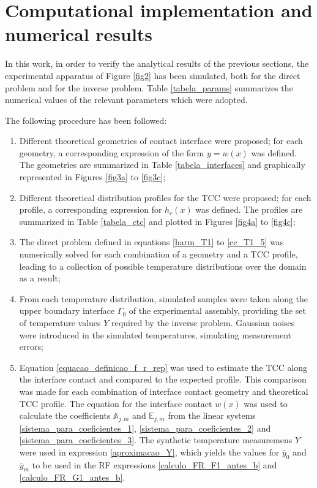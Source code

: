 \documentclass[12pt]{CHT-20}
\begin{document}
\section*{Computational implementation and numerical results}

In this work, in order to verify the analytical results of the previous sections, the experimental apparatus of Figure \ref{fig2} has been simulated, both for the direct problem and for the inverse problem. Table \ref{tabela_params} summarizes the numerical values of the relevant parameters which were adopted. 

The following procedure has been followed:
\begin{enumerate}
	\item Different theoretical geometries of contact interface were proposed; for each geometry, a corresponding expression of the form $y = w(x)$ was defined. The geometries are summarized in Table \ref{tabela_interfaces} and graphically represented in Figures \ref{fig3a} to \ref{fig3c};
	\item Different theoretical distribution profiles for the TCC were proposed; for each profile, a corresponding expression for $h_c(x)$ was defined. The profiles are summarized in Table \ref{tabela_ctc} and plotted in Figures \ref{fig4a} to \ref{fig4c};
	\item The direct problem defined in equations \eqref{harm_T1} to \eqref{cc_T1_5} was numerically solved for each combination of a geometry and a TCC profile, leading to a collection of possible temperature distributions over the domain as a result;
	\item From each temperature distribution, simulated samples were taken along the upper boundary interface $\Gamma_0$ of the experimental assembly, providing the set of temperature values $Y$ required by the inverse problem. Gaussian noises were introduced in the simulated temperatures, simulating measurement errors;
	\item Equation \eqref{equacao_definicao_f_r_rep} was used to estimate the TCC along the interface contact and compared to the expected profile. This comparison was made for each combination of interface contact geometry and theoretical TCC profile. The equation for the interface contact $w(x)$ was used to calculate the coefficients $\mathbb{A}_{j,m}$ and $\mathbb{E}_{j,m}$ from the linear systems \eqref{sistema_para_coeficientes_1}, \eqref{sistema_para_coeficientes_2} and \eqref{sistema_para_coeficientes_3}. The synthetic temperature measuremens $Y$ were used in expression \eqref{aproximacao_Y}, which yields the values for $\bar{y}_0$ and $\bar{y}_m$ to be used in the RF expressions \eqref{calculo_FR_F1_antes_b} and \eqref{calculo_FR_G1_antes_b}.
\end{enumerate}
\end{document}
